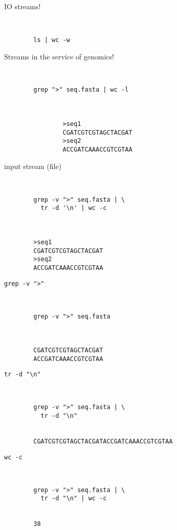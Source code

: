 \documentclass[xcolor=dvipsnames]{beamer}
\begin{document}
\begin{frame}[fragile]
	\huge
	IO streams!
	\Large
	\begin{verbatim}


		ls | wc -w
	\end{verbatim}
\end{frame}

\begin{frame}[fragile]
	\huge
	Streams in the service of genomics!
	\Large
	\begin{verbatim}


		grep ">" seq.fasta | wc -l



				>seq1
				CGATCGTCGTAGCTACGAT
				>seq2
				ACCGATCAAACCGTCGTAA
	\end{verbatim}
\end{frame}

\begin{frame}[fragile]
	\huge
	input stream (file)
	\Large
	\begin{verbatim}


		grep -v ">" seq.fasta | \
		  tr -d '\n' | wc -c



		>seq1
		CGATCGTCGTAGCTACGAT
		>seq2
		ACCGATCAAACCGTCGTAA
	\end{verbatim}
\end{frame}

\begin{frame}[fragile]
	\huge
	\verb!grep -v ">"!
	\Large
	\begin{verbatim}


		grep -v ">" seq.fasta



		CGATCGTCGTAGCTACGAT
		ACCGATCAAACCGTCGTAA
	\end{verbatim}
\end{frame}

\begin{frame}[fragile]
	\huge
	\verb!tr -d "\n"!
	\Large
	\begin{verbatim}


		grep -v ">" seq.fasta | \
		  tr -d "\n"


		CGATCGTCGTAGCTACGATACCGATCAAACCGTCGTAA
	\end{verbatim}
\end{frame}

\begin{frame}[fragile]
	\huge
	\verb!wc -c!
	\Large
	\begin{verbatim}


		grep -v ">" seq.fasta | \
		  tr -d "\n" | wc -c


		38
	\end{verbatim}
\end{frame}
\end{document}
